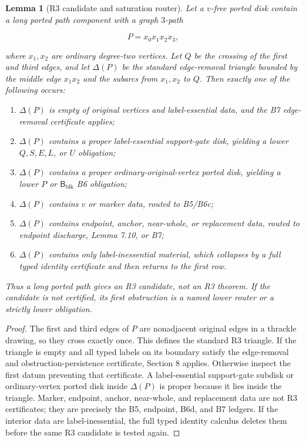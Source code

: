 \documentclass[11pt]{amsart}
\newtheorem{lemma}[theorem]{Lemma}
\theoremstyle{definition}
\begin{document}
\begin{lemma}[R3 candidate and saturation router]
Let a \(v\)-free ported disk contain a long ported path component with a graph \(3\)-path

\[
P=x_0x_1x_2x_3,
\]

where \(x_1,x_2\) are ordinary degree-two vertices. Let \(Q\) be the crossing of the first and third edges, and let \(\Delta(P)\) be the standard edge-removal triangle bounded by the middle edge \(x_1x_2\) and the subarcs from \(x_1,x_2\) to \(Q\). Then exactly one of the following occurs:

\begin{enumerate}
\item \(\Delta(P)\) is empty of original vertices and label-essential data, and the B7 edge-removal certificate applies;
\item \(\Delta(P)\) contains a proper label-essential support-gate disk, yielding a lower \(Q,S,E,L\), or \(U\) obligation;
\item \(\Delta(P)\) contains a proper ordinary-original-vertex ported disk, yielding a lower \(P\) or \(\mathsf B_{\mathrm{blk}}\) B6 obligation;
\item \(\Delta(P)\) contains \(v\) or marker data, routed to B5/B6c;
\item \(\Delta(P)\) contains endpoint, anchor, near-whole, or replacement data, routed to endpoint discharge, Lemma 7.10, or B7;
\item \(\Delta(P)\) contains only label-inessential material, which collapses by a full typed identity certificate and then returns to the first row.
\end{enumerate}

Thus a long ported path gives an R3 candidate, not an R3 theorem. If the candidate is not certified, its first obstruction is a named lower router or a strictly lower obligation.

\end{lemma}
\begin{proof}
The first and third edges of \(P\) are nonadjacent original edges in a thrackle drawing, so they cross exactly once. This defines the standard R3 triangle. If the triangle is empty and all typed labels on its boundary satisfy the edge-removal and obstruction-persistence certificate, Section 8 applies. Otherwise inspect the first datum preventing that certificate. A label-essential support-gate subdisk or ordinary-vertex ported disk inside \(\Delta(P)\) is proper because it lies inside the triangle. Marker, endpoint, anchor, near-whole, and replacement data are not R3 certificates; they are precisely the B5, endpoint, B6d, and B7 ledgers. If the interior data are label-inessential, the full typed identity calculus deletes them before the same R3 candidate is tested again.

\end{proof}
\end{document}
